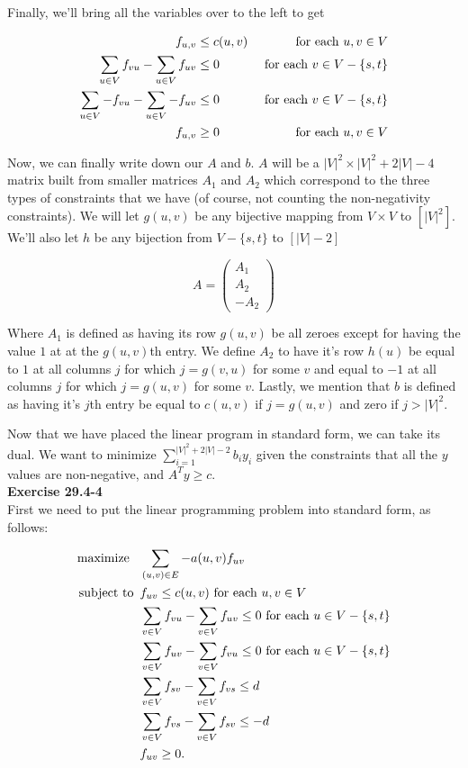 \documentclass{article}
\begin{document}
Finally, we'll bring all the variables over to the left to get

\begin{align*}
f_{u,v} &\le c(u,v) &\hbox{ for each $u,v\in V$}\\
\sum_{u\in V} f_{vu} -\sum_{u\in V} f_{uv}&\le 0  &\hbox{ for each $v\in V - \{s,t\}$}\\
\sum_{u\in V} -f_{vu} - \sum_{u\in V} -f_{uv}&\le 0  &\hbox{ for each $v\in V - \{s,t\}$}\\
f_{u,v} &\ge 0 &\hbox{ for each $u,v\in V$}\\
\end{align*}

Now, we can finally write down our $A$ and $b$. $A$ will be a $|V|^2 \times |V|^2 + 2|V| -4$ matrix built from smaller matrices $A_1$ and $A_2$ which correspond to the three types of constraints that we have (of course, not counting the non-negativity constraints). We will let $g(u,v)$ be any bijective mapping from $V\times V$ to $\left[|V|^2\right]$. We'll also let $h$ be any bijection from $V- \{s,t\}$ to $[|V|-2]$

\[
A = \left(\begin{array}{c}
A_1\\
A_2\\
-A_2
\end{array}\right)
\]

Where $A_1$ is defined as having its row $g(u,v)$ be all zeroes except for having the value $1$ at at the $g(u,v)$th entry. We define $A_2$ to have it's row $h(u)$ be equal to $1$ at all columns $j$ for which $j=g(v,u)$ for some $v$ and equal to $-1$ at all columns $j$ for which $j= g(u,v)$ for some $v$. Lastly, we mention that $b$ is defined as having it's $j$th entry be equal to $c(u,v)$ if $j =g(u,v)$ and zero if $j > |V|^2$.

Now that we have placed the linear program in standard form, we can take its dual. We want to minimize $\sum_{i=1}^{|V|^2+2|V|-2} b_i y_i$ given the constraints that all the $y$ values are non-negative, and $A^T y \ge c$.\\

\noindent\textbf{Exercise 29.4-4}\\

First we need to put the linear programming problem into standard form, as follows:

\begin{align*}
\mbox{maximize \,\,\,} & \sum_{(u,v) \in E} -a(u,v)f_{uv}\\
\mbox{subject to \,} & f_{uv} \leq c(u,v) \mbox{ for each } u,v \in V \\
& \sum_{v \in V} f_{vu} - \sum_{v \in V} f_{uv} \leq 0 \mbox{ for each } u \in V - \{s,t\} \\
& \sum_{v \in V} f_{uv} - \sum_{v \in V} f_{vu} \leq 0 \mbox{ for each } u \in V - \{s,t\} \\
& \sum_{v \in V} f_{sv} - \sum_{v \in V} f_{vs} \leq d \\
& \sum_{v \in V} f_{vs} - \sum_{v \in V} f_{sv} \leq -d \\ 
& f_{uv} \geq 0.\\
\end{align*}
\end{document}
